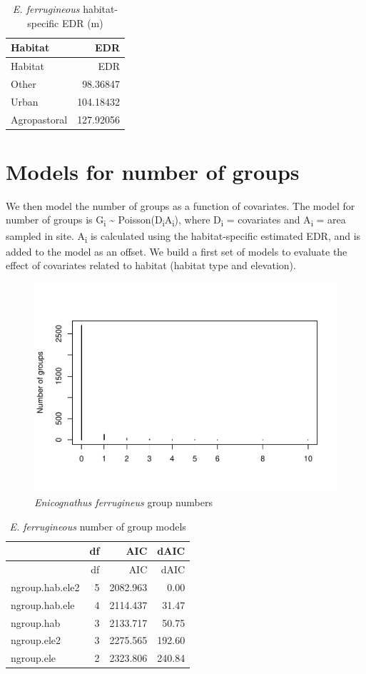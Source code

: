 \documentclass[]{article}
\begin{document}
\begin{longtable}[]{@{}lr@{}}
\caption{\textit{E. ferrugineous} habitat-specific EDR
(m)}\tabularnewline
\toprule
Habitat & EDR\tabularnewline
\midrule
\endfirsthead
\toprule
Habitat & EDR\tabularnewline
\midrule
\endhead
Other & 98.36847\tabularnewline
Urban & 104.18432\tabularnewline
Agropastoral & 127.92056\tabularnewline
\bottomrule
\end{longtable}

\section{Models for number of groups}\label{models-for-number-of-groups}

We then model the number of groups as a function of covariates. The
model for number of groups is G\textsubscript{i} \textasciitilde{}
Poisson(D\textsubscript{i}A\textsubscript{i}), where D\textsubscript{i}
= covariates and A\textsubscript{i} = area sampled in site.
A\textsubscript{i} is calculated using the habitat-specific estimated
EDR, and is added to the model as an offset. We build a first set of
models to evaluate the effect of covariates related to habitat (habitat
type and elevation).

\begin{figure}[H]
\includegraphics{Patagonia_parrots_density_analysis_files/figure-latex/unnamed-chunk-5-1} \caption{\textit{Enicognathus ferrugineus} group numbers }\label{fig:unnamed-chunk-5}
\end{figure}

\begin{longtable}[]{@{}lrrr@{}}
\caption{\textit{E. ferrugineous} number of group models}\tabularnewline
\toprule
& df & AIC & dAIC\tabularnewline
\midrule
\endfirsthead
\toprule
& df & AIC & dAIC\tabularnewline
\midrule
\endhead
ngroup.hab.ele2 & 5 & 2082.963 & 0.00\tabularnewline
ngroup.hab.ele & 4 & 2114.437 & 31.47\tabularnewline
ngroup.hab & 3 & 2133.717 & 50.75\tabularnewline
ngroup.ele2 & 3 & 2275.565 & 192.60\tabularnewline
ngroup.ele & 2 & 2323.806 & 240.84\tabularnewline
\bottomrule
\end{longtable}
\end{document}

